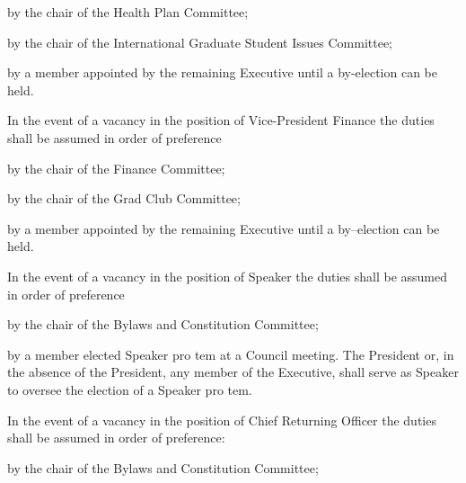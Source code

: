 \begin{longenum}[ label*=\thesubsection.\arabic*., align=left]
\begin{longenum}[ label*=\arabic*., align=left]
\begin{longenum}[ label*=\arabic*., align=left]
				\item by the chair of the Health Plan Committee;
				\item by the chair of the International Graduate Student Issues Committee;
				\item by a member appointed by the remaining Executive until a by-election can be held.
			\end{longenum}
			\item In the event of a vacancy in the position of Vice-President Finance the duties shall be assumed in order of preference
			\begin{longenum}[ label*=\arabic*., align=left]
				\item by the chair of the Finance Committee;
				\item by the chair of the Grad Club Committee;
				\item by a member appointed by the remaining Executive until a by--election can be held.
			\end{longenum}
			\item In the event of a vacancy in the position of Speaker the duties shall be assumed in order of preference
			\begin{longenum}[ label*=\arabic*., align=left]
				\item by the chair of the Bylaws and Constitution Committee;
				\item by a member elected Speaker pro tem at a Council meeting. The President or, in the absence of the President, any member of the Executive, shall serve as Speaker to oversee the election of a Speaker pro tem.
			\end{longenum}
			\item In the event of a vacancy in the position of Chief Returning Officer the duties shall be assumed in order of preference:
			\begin{longenum}[ label*=\arabic*., align=left]
				\item by the chair of the Bylaws and Constitution Committee;

\end{longenum}
\end{longenum}
\end{longenum}
